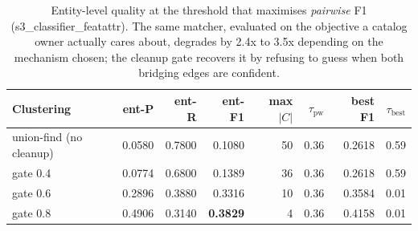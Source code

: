 \begin{table}[t]
\centering
\caption{Entity-level quality at the threshold that maximises \emph{pairwise} F1 (s3_classifier_featattr). The same matcher, evaluated on the objective a catalog owner actually cares about, degrades by 2.4x to 3.5x depending on the mechanism chosen; the cleanup gate recovers it by refusing to guess when both bridging edges are confident.}
\label{tab:entity}
\small
\begin{tabular}{lrrrrrrr}
\toprule
Clustering & ent-P & ent-R & ent-F1 & max $|C|$ & $\tau_{\mathrm{pw}}$ & best F1 & $\tau_{\mathrm{best}}$ \\
\midrule
union-find (no cleanup) & 0.0580 & 0.7800 & 0.1080 & 50 & 0.36 & 0.2618 & 0.59 \\
gate 0.4 & 0.0774 & 0.6800 & 0.1389 & 36 & 0.36 & 0.2618 & 0.59 \\
gate 0.6 & 0.2896 & 0.3880 & 0.3316 & 10 & 0.36 & 0.3584 & 0.01 \\
gate 0.8 & 0.4906 & 0.3140 & \textbf{0.3829} & 4 & 0.36 & 0.4158 & 0.01 \\
\bottomrule
\end{tabular}
\end{table}
